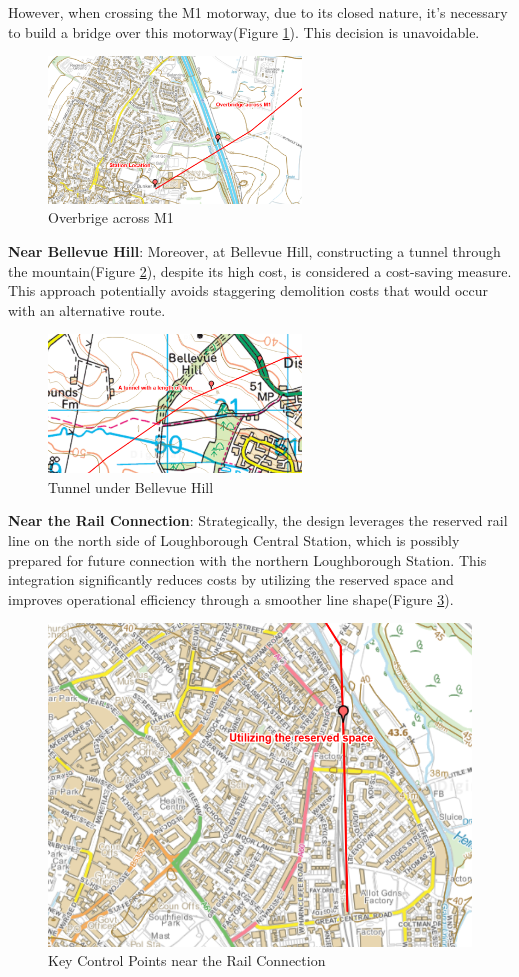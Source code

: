 \documentclass[letterpaper,12pt,leqno]{article}
\begin{document}
    However, when crossing the M1 motorway, due to its closed nature, it's necessary to build a bridge over this motorway(Figure \ref{fig:M1}). This decision is unavoidable.
\begin{figure}[H]
    \centering
    \includegraphics[width= 0.6\textwidth]{M1.png}
    \caption{Overbrige across M1}
    \label{fig:M1}
\end{figure}
    \textbf{Near Bellevue Hill}: Moreover, at Bellevue Hill, constructing a tunnel through the mountain(Figure \ref{fig:tunnel}), despite its high cost, is considered a cost-saving measure. This approach potentially avoids staggering demolition costs that would occur with an alternative route.
\begin{figure}[H]
    \centering
    \includegraphics[width= 0.6\textwidth]{tunnel.png}
    \caption{Tunnel under Bellevue Hill}
    \label{fig:tunnel}
\end{figure}
	
	\textbf{Near the Rail Connection}: Strategically, the design leverages the
	reserved rail line on the north side of Loughborough Central Station,
	which is possibly prepared for future connection with the northern
	Loughborough Station. This integration significantly reduces costs by
	utilizing the reserved space and improves operational efficiency
	through a smoother line shape(Figure \ref{fig:rail_connection}).
	
	\begin{figure}[H]
		\centering
		\includegraphics[width=0.6\linewidth]{reversed.png}
		\caption{Key Control Points near the Rail Connection}
		\label{fig:rail_connection}
	\end{figure}
 
\end{document}
